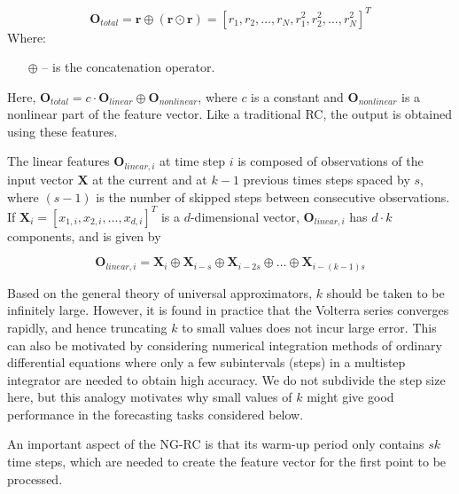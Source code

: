 \documentclass[11pt, oneside]{article}
\begin{document}
\begin{equation}
    \mathbf{O}_{total} = \mathbf{r} \oplus (\mathbf{r} \odot \mathbf{r}) = [r_1, r_2, \ldots, r_N, r_1^2, r_2^2, \ldots, r_N^2]^T
\end{equation}
Where:
\begin{itemize}[noitemsep, leftmargin=4cm, label={}]
    \item [\(\oplus\)] -- is the concatenation operator.

\end{itemize}
Here, \(\mathbf{O}_{total} = c \cdot \mathbf{O}_{linear} \oplus \mathbf{O}_{nonlinear}\), where \(c\) is a constant
and \(\mathbf{O}_{nonlinear}\) is a nonlinear part of the feature vector. Like a traditional RC, the output is obtained using these features.

The linear features \(\mathbf{O}_{linear,i}\) at time step \(i\) is composed of observations of the input vector \(\mathbf{X}\) at the current and at \(k-1\) previous times steps spaced by \(s\), where \((s-1)\) is the number of skipped steps between consecutive observations. If \(\mathbf{X}_i = [x_{1,i}, x_{2,i}, \ldots, x_{d,i}]^T\) is a \(d\)-dimensional vector, \(\mathbf{O}_{linear,i}\) has \(d \cdot k\) components, and is given by

\begin{equation}
    \mathbf{O}_{linear,i} = \mathbf{X}_i \oplus \mathbf{X}_{i-s} \oplus \mathbf{X}_{i-2s} \oplus \ldots \oplus \mathbf{X}_{i-(k-1)s}
\end{equation}

Based on the general theory of universal approximators, \(k\) should be taken to be infinitely large. However, it is found in practice that the Volterra series converges rapidly, and hence truncating \(k\) to small values does not incur large error. This can also be motivated by considering numerical integration methods of ordinary differential equations where only a few subintervals (steps) in a multistep integrator are needed to obtain high accuracy. We do not subdivide the step size here, but this analogy motivates why small values of \(k\) might give good performance in the forecasting tasks considered below.

An important aspect of the NG-RC is that its warm-up period only contains \(sk\) time steps, which are needed to create the feature vector for the first point to be processed.
\end{document}
